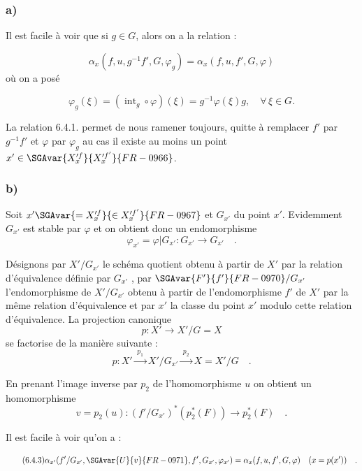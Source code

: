 \subsubsection*{a)} Il est facile à voir que si $g\in G$, alors on a la relation :

\begin{equation}\tag{6.4.1}
\alpha_x(f,u,g^{-1}f',G,\varphi_g)=\alpha_x(f,u,f',G,\varphi)
\end{equation}
où on a posé

\begin{equation}\tag{6.4.2}
\varphi_g(\xi)=(\operatorname{int}_g\circ\varphi)(\xi)=g^{-1}\varphi(\xi)g,
\quad \forall\,\xi\in G.
\end{equation}

La relation 6.4.1. permet de nous ramener toujours, quitte à remplacer $f'$ par $g^{-1}f'$ et $\varphi$ par $\varphi_g$ au cas  il existe au moins un point $x'\in \SGAvar{X_x^{\prime f}}{X_x^{\prime f'}}{FR-0966}$.

\subsubsection*{b)} Soit $x'\SGAvar{=X_x^{\prime f}}{\in X_x^{\prime f'}}{FR-0967}$ et $G_{x'}$   du point $x'$. Evidemment $G_{x'}$ est stable par $\varphi$ et on obtient donc un endomorphisme\[
\varphi_{x'} = \varphi|G_{x'} : G_{x'} \longrightarrow G_{x'} \quad .
\]

Désignons par $X'/G_{x'}$ le schéma quotient obtenu à partir de $X'$ par la relation d'équivalence définie par $G_{x'}$ , par $\SGAvar{F'}{f'}{FR-0970}/G_{x'}$ l'endomorphisme de $X'/G_{x'}$ obtenu à partir de l'endomorphisme $f'$ de $X'$ par la même relation d'équivalence et par $x'$ la classe du point $x'$ modulo cette relation d'équivalence.
La
projection canonique
\[
p : X' \longrightarrow X'/G = X
\]
se factorise de la manière suivante :
\[
p : X' \xrightarrow{\;p_1\;} X'/G_{x'} \xrightarrow{\;p_2\;} X = X'/G \quad .
\]

En prenant l'image inverse par $p_2$ de l'homomorphisme $u$ on obtient un homomorphisme
\[
v = p_2(u) : (f'/G_{x'})^*(p_2^*(F)) \longrightarrow p_2^*(F) \quad .
\]

Il est facile à voir qu'on a :

\begin{equation}\tag{6.4.3}
\alpha_{x'}(f'/G_{x'}, \SGAvar{U}{v}{FR-0971}, f', G_{x'}, \varphi_{x'}) = \alpha_x(f,u, f', G, \varphi) \quad (x = p(x')) \quad .
\end{equation}


